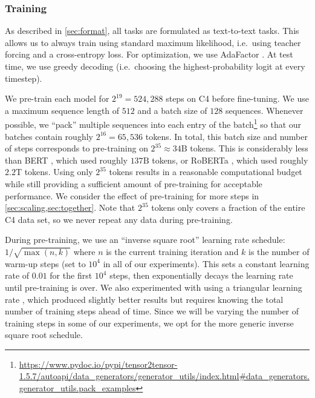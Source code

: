\documentclass[twoside,11pt]{article}
\begin{document}
\subsubsection{Training}
\label{sec:training}

As described in \cref{sec:format}, all tasks are formulated as text-to-text tasks.
This allows us to always train using standard maximum likelihood, i.e.\ using teacher forcing \citep{williams1989learning} and a cross-entropy loss.
For optimization, we use AdaFactor \citep{shazeer2018adafactor}.
At test time, we use greedy decoding (i.e.\ choosing the highest-probability logit at every timestep).

We pre-train each model for $2^{19} = 524{,}288$ steps on C4 before fine-tuning.
We use a maximum sequence length of $512$ and a batch size of $128$ sequences.
Whenever possible, we ``pack'' multiple sequences into each entry of the batch\footnote{\url{https://www.pydoc.io/pypi/tensor2tensor-1.5.7/autoapi/data_generators/generator_utils/index.html\#data_generators.generator_utils.pack_examples}} so that our batches contain roughly $2^{16} = 65{,}536$ tokens.
In total, this batch size and number of steps corresponds to pre-training on $2^{35} \approx 34\mathrm{B}$ tokens.
This is considerably less than BERT \citep{devlin2018bert}, which used roughly $137\mathrm{B}$ tokens, or RoBERTa \citep{liu2019roberta}, which used roughly $2.2\mathrm{T}$ tokens.
Using only $2^{35}$ tokens results in a reasonable computational budget while still providing a sufficient amount of pre-training for acceptable performance.
We consider the effect of pre-training for more steps in \cref{sec:scaling,sec:together}.
Note that $2^{35}$ tokens only covers a fraction of the entire C4 data set, so we never repeat any data during pre-training.

During pre-training, we use an ``inverse square root'' learning rate schedule: $1 \big/ \sqrt{\max(n, k)}$ where $n$ is the current training iteration and $k$ is the number of warm-up steps (set to $10^{4}$ in all of our experiments).
This sets a constant learning rate of $0.01$ for the first $10^{4}$ steps, then exponentially decays the learning rate until pre-training is over.
We also experimented with using a triangular learning rate \citep{howard2018universal}, which produced slightly better results but requires knowing the total number of training steps ahead of time.
Since we will be varying the number of training steps in some of our experiments, we opt for the more generic inverse square root schedule.
\end{document}
